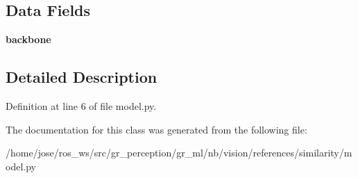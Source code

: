 \subsection*{Data Fields}
\begin{DoxyCompactItemize}
\item 
\mbox{\label{classmodel_1_1EmbeddingNet_ab3be29dfd459741bc08fc65dd5674408}} 
{\bfseries backbone}
\end{DoxyCompactItemize}


\subsection{Detailed Description}


Definition at line 6 of file model.\+py.



The documentation for this class was generated from the following file\+:\begin{DoxyCompactItemize}
\item 
/home/jose/ros\+\_\+ws/src/gr\+\_\+perception/gr\+\_\+ml/nb/vision/references/similarity/model.\+py\end{DoxyCompactItemize}
